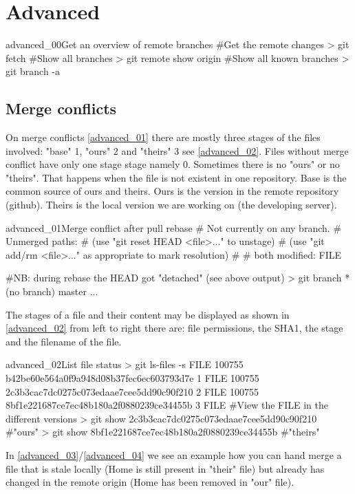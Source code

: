 \section{Advanced}
\begin{codelisting}{advanced_00}{Get an overview of remote branches}
#Get the remote changes
> git fetch
#Show all branches
> git remote show origin
#Show all known branches
> git branch -a
\end{codelisting}
\subsection{Merge conflicts}
On merge conflicts \ref{advanced_01} there are mostly three stages of the files involved: "base" 1, "ours" 2 and "theirs" 3 see \ref{advanced_02}. Files without merge conflict have only one stage stage namely 0. Sometimes there is no "ours" or no "theirs". That happens when the file is not existent in one repository. Base is the common source of ours and theirs. Ours is the version in the remote repository (github). Theirs is the local version we are working on (the developing server).
\begin{codelisting}{advanced_01}{Merge conflict after pull rebase}
# Not currently on any branch.
# Unmerged paths:
#   (use "git reset HEAD <file>..." to unstage)
#   (use "git add/rm <file>..." as appropriate to mark resolution)
#
#       both modified:    FILE

#NB: during rebase the HEAD got "detached" (see above output)
> git branch
* (no branch)
  master
...
\end{codelisting}
The stages of a file and their content may be displayed as shown in \ref{advanced_02} from left to right there are: file permissions, the SHA1, the stage and the filename of the file.
\begin{codelisting}{advanced_02}{List file status}
> git ls-files -s FILE
100755 b42be60e564a0f9a948d08b37fec6ec603793d7e 1       FILE
100755 2c3b3cac7dc0275c073edaae7cee5dd90c90f210 2       FILE
100755 8bf1e221687ce7ec48b180a2f0880239ce34455b 3       FILE
#View the FILE in the different versions
> git show 2c3b3cac7dc0275c073edaae7cee5dd90c90f210 #"ours"
> git show 8bf1e221687ce7ec48b180a2f0880239ce34455b #"theirs"
\end{codelisting}
In \ref{advanced_03}/\ref{advanced_04} we see an example how you can hand merge a file that is stale locally (Home is still present in "their" file) but already has changed in the remote origin (Home has been removed in "our" file).
